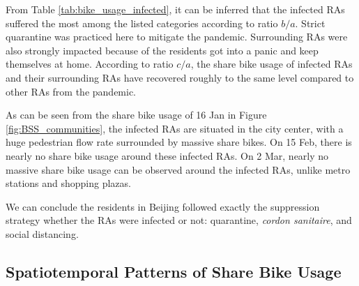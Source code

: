 \documentclass[ijgi,submit,moreauthors,pdftex]{Definitions/mdpi}
\begin{document}
From Table \ref{tab:bike_usage_infected}, it can be inferred that the infected RAs suffered the most among the listed categories according to ratio $b/a$.
Strict quarantine was practiced here to mitigate the pandemic.
Surrounding RAs were also strongly impacted because of the residents got into a panic and keep themselves at home.
According to ratio $c/a$, the share bike usage of infected RAs and their surrounding RAs have recovered roughly to the same level compared to other RAs from the pandemic.

As can be seen from the share bike usage of 16 Jan in Figure \ref{fig:BSS_communities}, the infected RAs are situated in the city center, with a huge pedestrian flow rate surrounded by massive share bikes.
On 15 Feb, there is nearly no share bike usage around these infected RAs.
On 2 Mar, nearly no massive share bike usage can be observed around the infected RAs, unlike metro stations and shopping plazas.

We can conclude the residents in Beijing followed exactly the suppression strategy whether the RAs were infected or not: quarantine, \textit{cordon sanitaire}, and social distancing.

\subsection{Spatiotemporal Patterns of Share Bike Usage}
\end{document}
